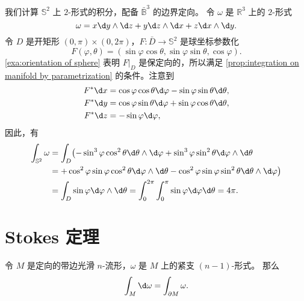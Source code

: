 \begin{example}
  我们计算 $\mathbb{S}^2$ 上 $2$-形式的积分，配备 $\bar{\mathbb{B}}^3$ 的边界定向。
  令 $\omega$ 是 $\mathbb{R}^3$ 上的 $2$-形式
  \[
    \omega=x\d y\wedge \d z+y\d z\wedge \d x+z\d x\wedge \d y.
  \]
  令 $D$ 是开矩形 $(0,\pi)\times (0,2\pi)$，$F:\bar D\to \mathbb{S}^2$
  是球坐标参数化 
  \[ 
    F(\varphi,\theta)=(\sin\varphi\cos\theta,\sin\varphi\sin\theta,\cos\varphi).
  \]
  \autoref{exa:orientation of sphere} 表明 $F|_D$ 是保定向的，所以满足
  \autoref{prop:integration on manifold by parametrization} 的条件。注意到 
  \begin{align*}
    F^*\d x&=\cos\varphi\cos\theta\d \varphi-\sin\varphi\sin\theta\d \theta,\\
    F^*\d y&=\cos\varphi\sin\theta\d \varphi+\sin\varphi\cos\theta\d \theta,\\
    F^*\d z&=-\sin\varphi\d \varphi,
  \end{align*}
  因此，有
  \begin{align*}
    \int_{\mathbb{S}^2}\omega&=\int_D\bigl(
      -\sin^3\varphi\cos^2\theta\d\theta\wedge\d\varphi
      +\sin^3\varphi\sin^2\theta\d\varphi\wedge\d\theta
    \bigr.\\
    &=\bigl.
      +\cos^2\varphi\sin\varphi\cos^2\theta\d\varphi\wedge\d\theta
      -\cos^2\varphi\sin\varphi\sin^2\theta\d\theta\wedge\d\varphi
    \bigr)\\
    &=\int_D\sin\varphi\d\varphi\wedge\d\theta=
    \int_0^{2\pi}\int_0^\pi \sin\varphi\d\varphi\d\theta=4\pi.
  \end{align*}
\end{example} 

\section{Stokes 定理}

\begin{theorem}[Stokes 定理]
  令 $M$ 是定向的带边光滑 $n$-流形，$\omega$ 是 $M$ 上的紧支 $(n-1)$-形式。
  那么 
  \begin{equation}
    \int_M\d\omega=\int_{\partial M}\omega.
  \end{equation}
\end{theorem}




